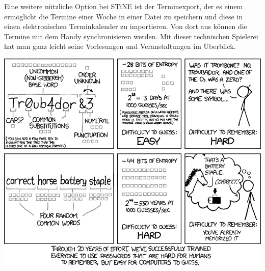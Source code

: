 Eine weitere nützliche Option bei STiNE ist der Terminexport, der es einem
ermöglicht die Termine einer Woche in einer Datei zu speichern und diese in
einen elektronischen Terminkalender zu importieren. Von dort aus können die
Termine mit dem Handy synchronisieren werden. Mit dieser technischen Spielerei
hat man ganz leicht seine Vorlesungen und Veranstaltungen im Überblick.

\begin{center}
\includegraphics[scale=0.525]{comics/936}
\end{center}
